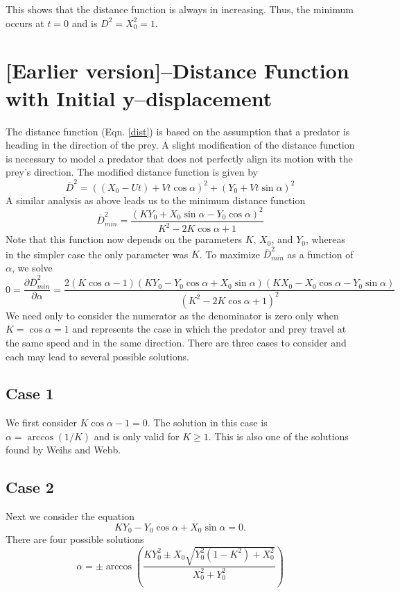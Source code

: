\documentclass[12pt]{article}
\def\ds{\displaystyle}
\def\d{\partial}
\newcommand{\ol}{\overline}
\begin{document}
This shows that the distance function is always in increasing. Thus, the minimum occurs at $t=0$ and is $D^2 = X_0^2 = 1.$

\section{[Earlier version]--Distance Function with Initial y--displacement}
The distance function (Eqn. \eqref{dist}) is based on the assumption that a predator is heading in the direction of the prey. A slight modification of the distance function is necessary to model a predator that does not perfectly align its motion with the prey's direction. The modified distance function is given by    
%
\begin{equation}
\ol D^2 = ((X_0 - Ut) + Vt\cos\alpha)^2 + (Y_0 + Vt\sin\alpha)^2
\label{eq:YDist}
\end{equation}
%
A similar analysis as above leads us to the minimum distance function
%
\begin{equation}
\ol D^2_{min}=\frac{(K Y_0+X_0 \sin \alpha -Y_0\cos \alpha)^2}{K^2-2 K \cos \alpha +1} 
\label{newDmin2}
\end{equation}
%
Note that this function now depends on the parameters $K$, $X_0$, and $Y_0$, whereas in the simpler case the only parameter was $K$. To maximize $\ol D^2_{min}$ as a function of $\alpha$, we solve
% 
\begin{equation}
0 = \frac{\d \ol D^2_{min}}{\d \alpha} = \frac{2(K \cos \alpha - 1)
	(K Y_0 - Y_0 \cos \alpha + X_0 \sin\alpha)(K X_0 - X_0 \cos \alpha - Y_0 \sin \alpha)}
	{(K^2 - 2K \cos \alpha + 1)^2}
\label{newDmin_dalpha}	
\end{equation}
%
We need only to consider the numerator as the denominator is zero only when $K = \cos \alpha = 1$ and represents the case in which the predator and prey travel at the same speed and in the same direction. There are three cases to consider and each may lead to several possible solutions.
% 
\subsection{Case 1}
We first consider $K \cos \alpha - 1=0$. The solution in this case is $\alpha = \arccos(1/K)$ and is only valid for $K\geq 1$. This is also one of the solutions found by Weihs and Webb.
%
\subsection{Case 2}
Next we consider the equation 
%
\begin{equation}
K Y_0 - Y_0 \cos \alpha + X_0 \sin\alpha = 0.
\end{equation}
%
There are four possible solutions 
%
\begin{equation}
\alpha = \pm \arccos \left( \frac{K Y_0^2 \pm X_0 
\ds\sqrt{Y_0^2(1- K^2) + X_0^2 }}{X_0^2+Y_0^2} \right )
\end{equation}
%	
\end{document}
